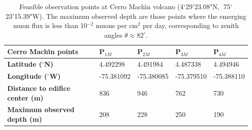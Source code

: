 \documentclass[letterpaper,10pt,titlepage,linenumber]{article}
\begin{document}
\begin{table}[!ht]
\centering
\begin{tabular}{lllll}
\hline
\textbf{Cerro Mach\'{\i}n points}        & \textbf{P$_{1M}$}    & \textbf{P$_{2M}$} & \textbf{P$_{3M}$} & \textbf{P$_{4M}$} \\ \hline
\textbf{Latitude  ($^{\circ}$N)}        & 4.492298             & 4.491984       & 4.487338       & 4.494946     \\
\textbf{Longitude ($^{\circ}$W)}        & -75.381092            & -75.380085      & -75.379510      & -75.388110    \\
\textbf{Distance to edifice center (m)} & 836               & 946         & 762         & 730       \\ 
\textbf{Maximum observed depth (m)}     & 208               & 228         & 250         & 190       \\ 
\hline
\end{tabular}
	\caption{Feasible observation points at Cerro Mach\'{\i}n volcano (4$^{\circ}$29'23.08"N,$\;$ 75$^{\circ}$23'15.39"W). The maximum observed depth are those points where the emerging muon flux is less than 10$^{-2}$ muons per cm$^{2}$ per day, corresponding to zenith angles $\theta \approx 82^\circ$. }
\label{TableMachin}
\end{table}
\end{document}
